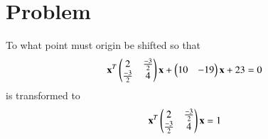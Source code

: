 \documentclass[journal,12pt,twocolumn]{IEEEtran}
\begin{document}
\section{Problem}
%
To what point must origin be shifted so that
\begin{align}\label{eq12}
\mathbf{x}^T\begin{pmatrix}2 & \frac{-3}{2}\\\frac{-3}{2}& 4\end{pmatrix}\mathbf{x}+\begin{pmatrix} 10& -19\end{pmatrix}\mathbf{x}+23=0
\end{align}
is transformed to 
\begin{align}\label{eq11}
\mathbf{x}^T\begin{pmatrix}2 & \frac{-3}{2}\\\frac{-3}{2}& 4\end{pmatrix}\mathbf{x}=1
\end{align}
\end{document}
